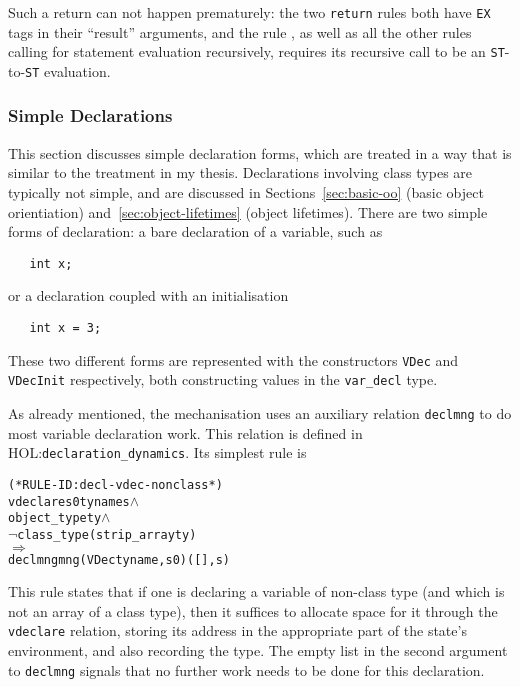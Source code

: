 \documentclass[11pt]{article}
\newcommand{\HOLfile}[1]{HOL:\texttt{#1}}
\begin{document}
  Such a return can not
happen prematurely: the two \texttt{return} rules both have
\texttt{EX} tags in their ``result'' arguments, and the rule
, as well as all the other rules calling
for statement evaluation recursively, requires its recursive call to
be an \texttt{ST}-to-\texttt{ST} evaluation.

\subsubsection{Simple Declarations}
\label{sec:simple-declarations}

This section discusses simple declaration forms, which are treated in
a way that is similar to the treatment in my thesis.  Declarations
involving class types are typically not simple, and are discussed in
Sections~\ref{sec:basic-oo} (basic object orientiation)
and~\ref{sec:object-lifetimes} (object lifetimes). There are two
simple forms of declaration: a bare declaration of a variable, such as
\begin{verbatim}
   int x;
\end{verbatim}
or a declaration coupled with an initialisation
\begin{verbatim}
   int x = 3;
\end{verbatim}
  These
two different forms are represented with the constructors
\texttt{VDec} and \texttt{VDecInit} respectively, both constructing
values in the \texttt{var_decl} type.

%
As already mentioned, the \cpp{} mechanisation uses an auxiliary
relation \texttt{declmng} to do most variable declaration work.  This
relation is defined in \HOLfile{declaration_dynamics}.  Its simplest
rule is
\begin{center}
\begin{minipage}{\textwidth}
%
\begin{alltt}
(* RULE-ID: decl-vdec-nonclass *)
     vdeclare s0 ty name s \(\land\)
     object_type ty \(\land\)
     \(\neg\)class_type (strip_array ty)
   \(\Rightarrow\)
     declmng mng (VDec ty name, s0) ([], s)
\end{alltt}
  \end{minipage}
\end{center}
This rule states that if one is declaring a variable of non-class type
(and which is not an array of a class type), then it suffices to
allocate space for it through the \texttt{vdeclare} relation, storing
its address in the appropriate part of the state's environment, and
also recording the type.  The empty list in the second argument to
\texttt{declmng} signals that no further work needs to be done for
this declaration.
\end{document}
